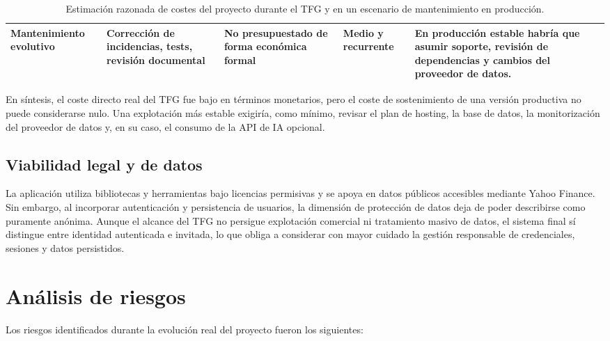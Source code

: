 \begin{table}[htbp]
\begin{tabular}{|p{}|p{}|p{}|p{}|p{}|}
Mantenimiento evolutivo & Corrección de incidencias, tests, revisión documental & No presupuestado de forma económica formal & Medio y recurrente & En producción estable habría que asumir soporte, revisión de dependencias y cambios del proveedor de datos. \\ \hline
\end{tabular}
\caption{Estimación razonada de costes del proyecto durante el TFG y en un escenario de mantenimiento en producción.}
\label{tab:estimacion-costes-tfg}
\end{table}

En síntesis, el coste directo real del TFG fue bajo en términos monetarios, pero el coste de sostenimiento de una versión productiva no puede considerarse nulo. Una explotación más estable exigiría, como mínimo, revisar el plan de hosting, la base de datos, la monitorización del proveedor de datos y, en su caso, el consumo de la API de IA opcional.

\subsection{Viabilidad legal y de datos}

La aplicación utiliza bibliotecas y herramientas bajo licencias permisivas y se apoya en datos públicos accesibles mediante Yahoo Finance. Sin embargo, al incorporar autenticación y persistencia de usuarios, la dimensión de protección de datos deja de poder describirse como puramente anónima. Aunque el alcance del TFG no persigue explotación comercial ni tratamiento masivo de datos, el sistema final sí distingue entre identidad autenticada e invitada, lo que obliga a considerar con mayor cuidado la gestión responsable de credenciales, sesiones y datos persistidos.

\section{Análisis de riesgos}

Los riesgos identificados durante la evolución real del proyecto fueron los siguientes:

